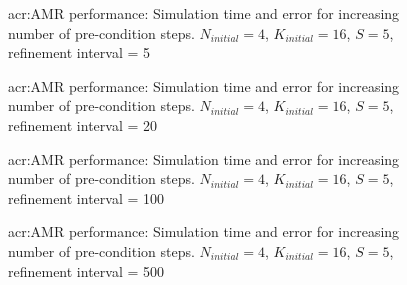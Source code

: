 \begin{figure}[H]
    \centering
    \caption{\Acrlong{acr:AMR} performance: Simulation time and error for increasing number of pre-condition steps. \(N_{initial} = 4\), \(K_{initial} = 16\), \(S = 5\), refinement interval = 5}\label{fig:adaptivity_efficiency_A5}
\end{figure}

\begin{figure}[H]
    \centering
    \hfill
    \caption{\Acrlong{acr:AMR} performance: Simulation time and error for increasing number of pre-condition steps. \(N_{initial} = 4\), \(K_{initial} = 16\), \(S = 5\), refinement interval = 20}\label{fig:adaptivity_efficiency_A20}
\end{figure}

\begin{figure}[H]
    \centering
    \hfill
    \caption{\Acrlong{acr:AMR} performance: Simulation time and error for increasing number of pre-condition steps. \(N_{initial} = 4\), \(K_{initial} = 16\), \(S = 5\), refinement interval = 100}\label{fig:adaptivity_efficiency_A100}
\end{figure}

\begin{figure}[H]
    \centering
    \hfill
    \caption{\Acrlong{acr:AMR} performance: Simulation time and error for increasing number of pre-condition steps. \(N_{initial} = 4\), \(K_{initial} = 16\), \(S = 5\), refinement interval = 500}\label{fig:adaptivity_efficiency_A500}
\end{figure}

